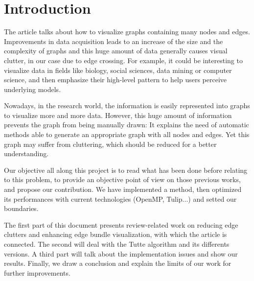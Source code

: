 \chapter*{Introduction}

The article talks about how to visualize graphs containing many nodes and edges. Improvements in data acquisition leads to an increase of the size and the complexity of graphs and this huge amount of data generally causes visual clutter, in our case due to edge crossing.
For example, it could be interesting to visualize data in fields like biology, social sciences, data mining or computer science, and then emphasize their high-level pattern to help users perceive underlying models.


Nowadays, in the research world, the information is easily represented into graphs to visualize more and more data. However, this huge amount of information prevents the graph from being manually drawn:  It explains the need of automatic methods able to generate an appropriate graph with all nodes and edges. Yet this graph may suffer from cluttering, which should be reduced for a better understanding.

Our objective all along this project is to read what has been done before relating to this problem, to provide an objective point of view on those previous works, and propose our contribution. We have implemented a method, then optimized its performances with
 current technologies (OpenMP, Tulip...) and setted our boundaries. 


The first part of this document presents review-related work on reducing edge clutters and enhancing edge bundle visualization, with which the article is connected. The second will deal with the Tutte algorithm and its differents versions. A third part will talk about the implementation issues and show our results. Finally, we draw a conclusion and explain the limits of our work for further improvements.

